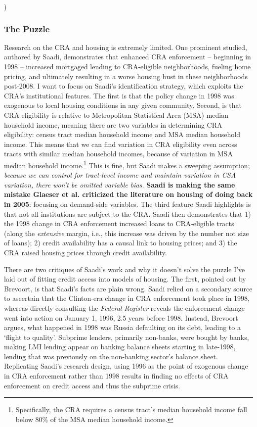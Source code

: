 )\documentclass{article}[11pt]
\begin{document}
		\subsubsection{The Puzzle}
Research on the CRA and housing is extremely limited. One prominent studied, authored by Saadi, demonstrates that enhanced CRA enforcement -- beginning in 1998 -- increased mortgaged lending to CRA-eligible neighborhoods, fueling home pricing, and ultimately resulting in a worse housing bust in these neighborhoods post-2008. \citep{saadi2020role} I want to focus on Saadi's identification strategy, which exploits the CRA's institutional features. The first is that the policy change in 1998 was exogenous to local housing conditions in any given community. Second, is that CRA eligibility is relative to Metropolitan Statistical Area (MSA) median household income, meaning there are two variables in determining CRA eligibility: census tract median household income and MSA median household income. This means that we can find variation in CRA eligibility even across tracts with similar median household incomes, because of variation in MSA median household income.\footnote{Specifically, the CRA requires a census tract's median household income fall below 80\% of the MSA median household income.} This is fine, but Saadi makes a sweeping assumption; \textit{because we can control for tract-level income and maintain variation in CSA variation, there won't be omitted variable bias.} \textbf{Saadi is making the same mistake Glaeser et al. criticized the literature on housing of doing back in 2005}: focusing on demand-side variables. \citep{glaeser2005empirical} The third feature Saadi highlights is that not all institutions are subject to the CRA. Saadi then demonstrates that 1) the 1998 change in CRA enforcement increased loans to CRA-eligible tracts (along the \textit{extensive} margin, i.e., this increase was driven by the number not size of loans); 2) credit availability has a causal link to housing prices; and 3) the CRA raised housing prices through credit availability.

There are two critiques of Saadi's work and why it doesn't solve the puzzle I've laid out of fitting credit access into models of housing. The first, pointed out by Brevoort, is that Saadi's facts are plain wrong. \citep{brevoort2024reexamining} Saadi relied on a secondary source to ascertain that the Clinton-era change in CRA enforcement took place in 1998, whereas directly consulting the \textit{Federal Register} reveals the enforcement change went into action on January 1, 1996, 2.5 years before 1998. Instead, Brevoort argues, what happened in 1998 was Russia defaulting on its debt, leading to a `flight to quality'. Subprime lenders, primarily non-banks, were bought by banks, making LMI lending appear on banking balance sheets starting in late-1998, lending that was previously on the non-banking sector's balance sheet. Replicating Saadi's research design, using 1996 as the point of exogenous change in CRA enforcement rather than 1998 results in finding no effects of CRA enforcement on credit access and thus the subprime crisis.
\end{document}
